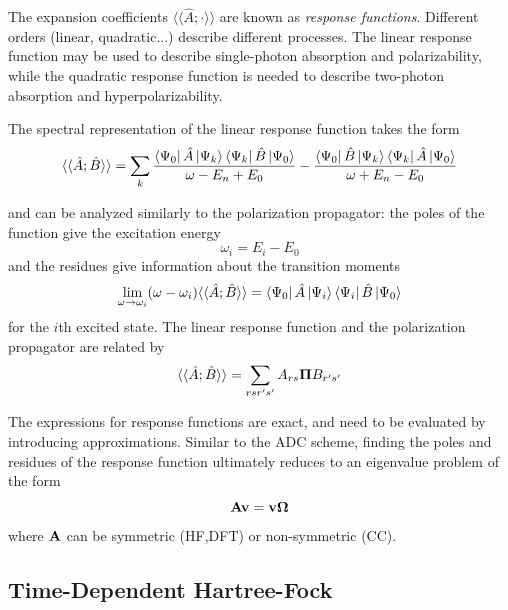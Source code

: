 \noindent The expansion coefficients $\langle\langle \hat{A}; \cdot \rangle\rangle$ are known as \emph{response functions}. Different orders (linear, quadratic...) describe different processes. The linear response function may be used to describe single-photon absorption and polarizability, while the quadratic response function is needed to describe two-photon absorption and hyperpolarizability. 

The spectral representation of the linear response function takes the form
\begin{equation}
\langle\langle \hat{A}; \hat{B}
\rangle\rangle = \sum_k \frac{
	\bra{\smash{\Psi_0}}\hat{A}\ket{\smash{\Psi_k}} \bra{\smash{\Psi_k}} \hat{B} \ket{\smash{\Psi_0}}
}{
	\omega - E_n + E_0
} - \frac{ 
	\bra{\smash{\Psi_0}}\hat{B}\ket{\smash{\Psi_k}} \bra{\smash{\Psi_k}} \hat{A} \ket{\smash{\Psi_0}}
}{
	\omega + E_n - E_0
}
\end{equation}

\noindent and can be analyzed similarly to the polarization propagator: the poles of the function give the excitation energy
\begin{equation}
\omega_i = E_i - E_0
\end{equation}
and the residues give information about the transition moments 
\begin{equation}
\lim_{\omega \rightarrow  \omega_i} (\omega - \omega_i) \langle\langle \hat{A}; \hat{B} \rangle \rangle = \bra{\smash{\Psi_0}}\hat{A}\ket{\smash{\Psi_i}} \bra{\smash{\Psi_i}} \hat{B} \ket{\smash{\Psi_0}}
\end{equation}
for the $i$th excited state. The linear response function and the polarization propagator are related by \cite{Sch2018}
\begin{equation}
\langle\langle \hat{A}; \hat{B}
\rangle\rangle = \sum_{rsr's'} A_{rs} \mathbf{\Pi} B_{r's'}
\end{equation}

The expressions for response functions are exact, and need to be evaluated by introducing approximations. Similar to the ADC scheme, finding the poles and residues of the response function ultimately reduces to an eigenvalue problem of the form
\begin{equation}
\mathbf{A}\mathbf{v} = \mathbf{v}\mathbf{\Omega}
\end{equation}
\noindent where $\mathbf{A}$ can be symmetric (HF,DFT) or non-symmetric (CC).

\subsection{Time-Dependent Hartree-Fock}

